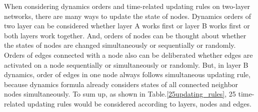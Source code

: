 When considering dynamics orders and time-related updating rules on two-layer networks, there are many ways to update the state of nodes. Dynamics orders of two layer can be considered whether layer A works first or layer B works first or both layers work together. And, orders of nodes can be thought about whether the states of nodes are changed simultaneously or sequentially or randomly. Orders of edges connected with a node also can be deliberated whether edges are activated on a node sequentially or simultaneously or randomly. But, in layer B dynamics, order of edges in one node always follows simultaneous updating rule, because dynamics formula already considers states of all connected neighbor nodes simultaneously. To sum up, as shown in Table.\ref{25updating_rules}, 25 time-related updating rules would be considered according to layers, nodes and edges. 
